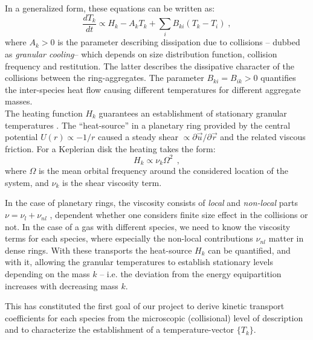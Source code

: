 \documentclass[11pt, notitlepage]{article} %
\begin{document}
In a generalized form, these equations can be written as:
\begin{equation}
\label{eq:T_balance}
	\frac{dT_k}{dt} \propto H_k -A_kT_k+\sum_{i}B_{ki}(T_k-T_i)\;,
\end{equation}
where $A_k>0$ is the parameter describing dissipation due to collisions -- dubbed as \emph{granular cooling}-- which depends on size 
distribution function, collision frequency and restitution. The latter describes the dissipative character of the collisions between the
ring-aggregates. The parameter $B_{ki}=B_{ik}>0$ quantifies the inter-species heat flow causing different temperatures for different 
aggregate masses.\\
 The heating function $H_k$  guarantees an establishment of stationary granular temperatures \citep{Bodrova2014}. The ``heat-source''
 in a planetary ring  provided by the central potential $U(r) \propto - 1/r$ caused  a steady shear $\propto \partial\vec u/\partial\vec r$
and the related viscous friction. For a Keplerian disk the heating  takes the form:
\begin{equation}
	H_k \propto \nu_k\Omega^2 ~~ , 
\label{eq:Heating}
\end{equation}
where $\Omega$ is the mean orbital frequency around the considered location of the system,
and $\nu_k$ is the shear viscosity term. 

In the case of planetary rings, the viscosity consists of \emph{local} and \emph{non-local} parts $\nu=\nu_l + \nu_{nl}$ 
\citep{spahn2006c,schmidt2009,Seiss2011}, dependent whether one considers finite size effect in the collisions or not. 
In the case of a gas with different species, we need to know the viscosity terms for each species, where especially the non-local
contributions $\nu_{nl}$ matter in dense rings. With these transports the heat-source $H_k$ can be quantified, and with it, 
allowing the granular temperatures to establish stationary levels depending on the mass $k$ -- i.e. the deviation from the
energy equipartition increases with decreasing mass $k$.

This has constituted the first goal of our project to derive kinetic transport coefficients for each species from the microscopic 
(collisional) level of description and to characterize the establishment of a temperature-vector $\{T_k\}$.\\
\end{document}
